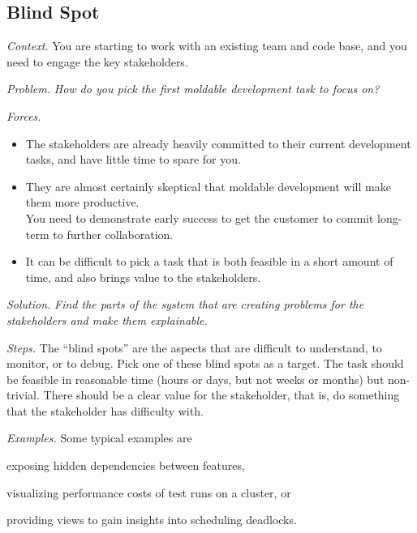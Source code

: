 \documentclass[sigconf,screen]{acmart}
\newcommand\eog[1]{\nbc{Edward}{#1}{purple}}
\newcommand\cp[1]{\nbe{Cesare}{#1}{olive}} %
\newcommand{\pattern}[2]{\needlines{10}
\subsection*{#1}\label{pat:#2}}
\newcommand{\patsec}[1]{\noindent\textit{#1.}\xspace}
\begin{document}
\pattern{Blind Spot}{BlindSpot}
\patsec{Context}
You are starting to work with an existing team and code base, and you need to engage the key stakeholders.

\patsec{Problem}
\emph{How do you pick the first moldable development task to focus on?}

\patsec{Forces}
\begin{itemize}[---]
\item The stakeholders are already heavily committed to their current development tasks, and have little time to spare for you.
\item They are almost certainly skeptical that moldable development will make them more productive.\\
You need to demonstrate early success to get the customer to commit long-term to further collaboration.
\item It can be difficult to pick a task that is both feasible in a short amount of time, and also brings value to the stakeholders.
\end{itemize}

\patsec{Solution}
\emph{Find the parts of the system that are creating problems for the stakeholders and make them explainable.}

\patsec{Steps}
The ``blind spots'' are the aspects that are difficult to understand, to monitor, or to debug.
Pick one of these blind spots as a target.
The task should be feasible in reasonable time
(\ie hours or days, but not weeks or months)
but non-trivial.
There should be a clear value for the stakeholder, that is, do something that the stakeholder has difficulty with.


\patsec{Examples}
Some typical examples are 
\begin{inparaenum}[(i)]
\item exposing hidden dependencies between features, 
\item visualizing performance costs of test runs on a cluster, or
\item providing views to gain insights into scheduling deadlocks.
\end{inparaenum}
\end{document}
